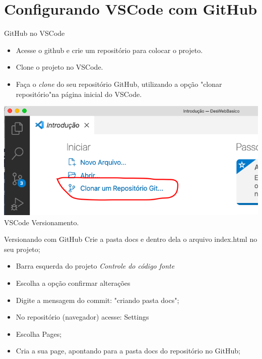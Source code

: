 \documentclass{beamer}
\begin{document}
\section{Configurando VSCode com GitHub}
\begin{frame}{GitHub no VSCode}
\begin{itemize}
  \item Acesse o github e crie um repositório para colocar o projeto.
   \item Clone o projeto no VSCode.
   \item Faça o \textit{clone} do seu repositório GitHub, utilizando a opção "clonar repositório"na página inicial do VSCode.
   \end{itemize}
       \includegraphics[height=0.4\paperheight]{fig/aula4/aula4_1.png} \\
       \tiny{VSCode Versionamento}.
     
\end{frame}
\begin{frame}{Versionando com GitHub}
Crie a pasta docs e dentro dela o arquivo index.html no seu projeto;
\begin{itemize}
   \item Barra esquerda do projeto \textit{Controle do código fonte}
   \item Escolha a opção confirmar alterações
   \item Digite a mensagem do commit: "criando pasta docs";
   \item No repositório (navegador) acesse: Settings
   \item Escolha Pages;
   \item Cria a sua page, apontando para a pasta docs do repositório no GitHub;
\end{itemize}
\end{frame}


\end{document}
